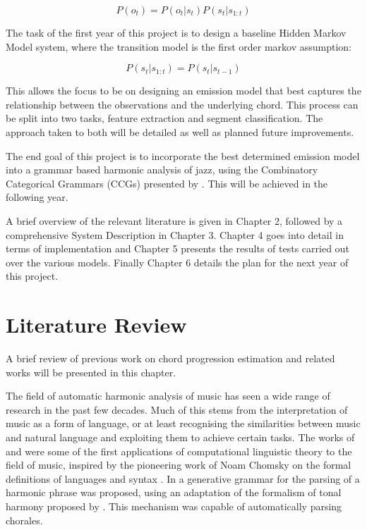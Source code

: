 \documentclass[bsc,singlespacing,parskip,deptreport,twoside,frontabs]{infthesis}
\begin{document}
\begin{equation}
\label{eq}
P(o_t) = P(o_t | s_t)P(s_t | s_{1:t}) 
\end{equation}

The task of the first year of this project is to design a baseline Hidden Markov Model system, where the transition model is the first order markov assumption:

\begin{equation}
\label{hmm_eq}
P(s_t | s_{1:t}) = P(s_t | s_{t-1}) 
\end{equation}

This allows the focus to be on designing an emission model that best captures the relationship between the observations and the underlying chord. This process can be split into two tasks, feature extraction and segment classification. The approach taken to both will be detailed as well as planned future improvements.

The end goal of this project is to incorporate the best determined emission model into a grammar based harmonic analysis of jazz, using the Combinatory Categorical Grammars (CCGs) presented by \cite{ccg}. This will be achieved in the following year.

A brief overview of the relevant literature is given in Chapter 2, followed by a comprehensive System Description in Chapter 3. Chapter 4 goes into detail in terms of implementation and Chapter 5 presents the results of tests carried out over the various models. Finally Chapter 6 details the plan for the next year of this project.

\chapter{Literature Review}

A brief review of previous work on chord progression estimation and related works will be presented in this chapter.

The field of automatic harmonic analysis of music has seen a wide range of research in the past few decades. Much of this stems from the interpretation of music as a form of language, or at least recognising the similarities between music and natural language and exploiting them to achieve certain tasks. The works of \cite{winograd1968linguistics} and \cite{forte1967syntax} were some of the first applications of computational linguistic theory to the field of music, inspired by the pioneering work of Noam Chomsky on the formal definitions of languages and syntax \cite[]{lees1957syntactic}. In \cite{winograd1968linguistics} a generative grammar for the parsing of a harmonic phrase was proposed, using an adaptation of the formalism of tonal harmony proposed by \cite{forte1962tonal}. This mechanism was capable of automatically parsing chorales.
\end{document}
